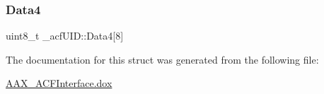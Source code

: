 \mbox{\label{a01405_aefd8884cd99d91f3213573876983b0ed}} 
\subsubsection{\texorpdfstring{Data4}{Data4}}
{\footnotesize\ttfamily uint8\+\_\+t \+\_\+acf\+U\+I\+D\+::\+Data4\mbox{[}8\mbox{]}}



The documentation for this struct was generated from the following file\+:\begin{DoxyCompactItemize}
\item 
\mbox{\hyperlink{a00269}{A\+A\+X\+\_\+\+A\+C\+F\+Interface.\+dox}}\end{DoxyCompactItemize}
